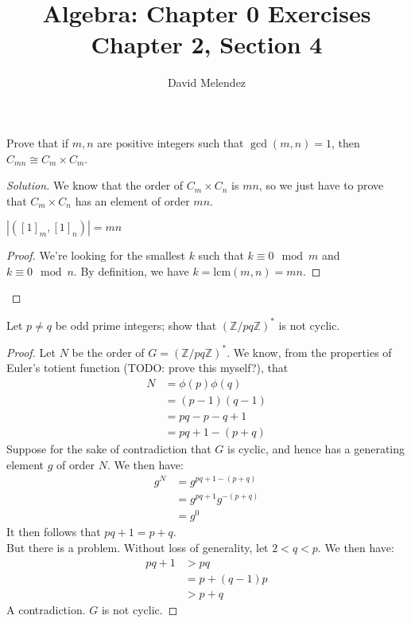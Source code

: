 \documentclass[12pt]{article}
\newenvironment{problem}[2][Problem]{\begin{trivlist}
\item[\hskip \labelsep {\bfseries #1}\hskip \labelsep {\bfseries #2.}]}{\end{trivlist}}
\newenvironment{proposition}[1][Proposition]{\begin{trivlist}
\item[\hskip \labelsep {\bfseries #1.}]}{\end{trivlist}}
\newcommand{\lcm}[1]{\text{lcm}(#1)}
\newenvironment{solution}
  {\renewcommand\qedsymbol{$\blacksquare$}\begin{proof}[Solution]}
{\end{proof}}
\newenvironment{sproof}{
  \renewcommand\qedsymbol{$\square$}
  \begin{proof}
  }{
  \end{proof}
}
\begin{document}
\title{Algebra: Chapter 0 Exercises\\ \large Chapter 2, Section 4}
\author{David Melendez}
\maketitle

\begin{problem}{4.9}
  Prove that if $m,n$ are positive integers such that $\gcd(m,n)=1$, then \\
  $C_{mn} \cong C_m\times C_m$.
\end{problem}
\begin{solution}
  We know that the order of $C_m\times C_n$ is $mn$, so we just have to prove that $C_m\times C_n$ has an
  element of order $mn$.
  \begin{proposition}
    $|([1]_m,[1]_n)| = mn$
  \end{proposition}
  \begin{sproof}
    We're looking for the smallest $k$ such that $k\equiv 0\mod m$ and $k\equiv 0\mod n$.
    By definition, we have $k = \lcm{m,n}=mn$.
  \end{sproof}
\end{solution}
\begin{problem}{4.10}
  Let $p\neq q$ be odd prime integers; show that $(\mathbb{Z}/pq\mathbb{Z})^*$ is not cyclic.
\end{problem}
\begin{proof}
  Let $N$ be the order of $G=(\mathbb{Z}/pq\mathbb{Z})^*$. 
  We know, from the properties of Euler's totient function (TODO: prove this myself?), that
  \begin{align*}
    N &= \phi(p)\phi(q) \\
    &= (p-1)(q-1)\\
    &= pq - p - q + 1 \\
    &= pq + 1 - (p+q)
  \end{align*}
  Suppose for the sake of contradiction that $G$ is cyclic, 
  and hence has a generating element $g$ of order $N$.
  We then have:
  \begin{align*}
    g^N &= g^{pq+1-(p+q)} \\
    &= g^{pq+1}g^{-(p+q)} \\
      &= g^0
  \end{align*}
  It then follows that $pq+1=p+q$. \\
  But there is a problem. Without loss of generality, let $2<q<p$. 
  We then have:
  \begin{align*}
    pq+1 &> pq \\
    &= p+(q-1)p \\
    &> p+q
  \end{align*}
  A contradiction. $G$ is not cyclic.
\end{proof}
\end{document}
